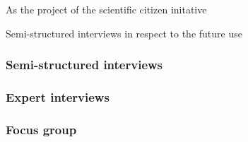 As the project of the scientific citizen initative 

Semi-structured interviews in respect to the future use

\subsubsection{Semi-structured interviews}

\subsubsection{Expert interviews}

\subsubsection{Focus group}

